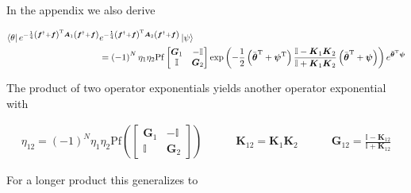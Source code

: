 \documentclass{article}
\begin{document}
In the appendix we also derive

\begin{align}
	\bra{\theta} e^{-\frac{1}{4}\left(\boldsymbol{f}^{\dagger} + \boldsymbol{f} \right)^{\mathrm{T}} \boldsymbol{A}_{1}  \left(\boldsymbol{f}^{\dagger} + \boldsymbol{f} \right) }&e^{-\frac{1}{4}\left(\boldsymbol{f}^{\dagger} + \boldsymbol{f} \right)^{\mathrm{T}} \boldsymbol{A}_{2}  \left(\boldsymbol{f}^{\dagger} + \boldsymbol{f} \right) } \ket{\psi}\\ &= \left(-1\right)^{N}\eta_{1}\eta_{2}\mathrm{Pf} \begin{bmatrix}
		\boldsymbol{G}_{1} & -\mathbb{I} \\
		\mathbb{I} & \boldsymbol{G}_{2}  
	\end{bmatrix}  
	\exp \left( -\frac{1}{2}\left(\bar{\boldsymbol{\theta} }^{\mathrm{T}  } + \boldsymbol{\psi}^{\mathrm{T}  } \right) \frac{\mathbb{I} - \boldsymbol{K}_{1}\boldsymbol{K}_{2}  }{\mathbb{I} + \boldsymbol{K}_{1}\boldsymbol{K}_{2} } \left(\bar{\boldsymbol{\theta} }^{\mathrm{T}} + \boldsymbol{\psi}  \right)  \right) e^{\bar{\boldsymbol{\theta} }^{\mathrm{T}  }\boldsymbol{\psi}} \nonumber \\
\end{align}

The product of two operator exponentials yields another operator exponential with

\begin{align}
	\eta _{12} = \left(-1\right)^{N}\eta_{1}\eta_2 \mathrm{Pf} \left(\begin{bmatrix}
		\boldsymbol{G}_{1} & -\mathbb{I} \\
		\mathbb{I} & \boldsymbol{G}_{2} 
	\end{bmatrix} \right) \quad\quad\quad \boldsymbol{K}_{12}=\boldsymbol{K}_1 \boldsymbol{K}_2 \quad\quad\quad \boldsymbol{G}_{12}=\frac{\mathbb{I} - \boldsymbol{K}_{12} }{\mathbb{I} + \boldsymbol{K}_{12} }
\end{align}

For a longer product this generalizes to
\end{document}
